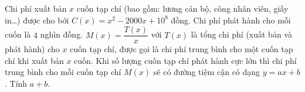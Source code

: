 \begin{ex}%
Chi phí xuất bản $x$ cuốn tạp chí (bao gồm: lương cán bộ, công nhân viên, giấy in\ldots) được cho bởi $C(x)=x^2-2000 x+10^8$ đồng. Chi phí phát hành cho mỗi cuốn là $4$ nghìn đồng. $M(x)=\dfrac{T(x)}{x}$ với $T(x)$ là tổng chi phí (xuất bản và phát hành) cho $x$ cuốn tạp chí, được gọi là chi phí trung bình cho một cuốn tạp chí khi xuất bản $x$ cuốn. Khi số lượng cuốn tạp chí phát hành cực lớn thì chi phí trung bình cho mỗi cuốn tạp chí $M(x)$ sẽ có đường tiệm cận có dạng $y=ax+b$. Tính $a+b$.
\end{ex}

